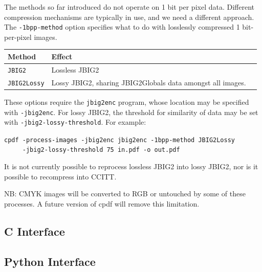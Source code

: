 \documentclass{book}
\begin{document}
\noindent The methods so far introduced do not operate on 1 bit per pixel data. Different compression mechanisms are typically in use, and we need a different approach. The \texttt{-1bpp-method} option specifies what to do with losslessly compressed 1 bit-per-pixel images.

\bigskip
\begin{tabular}{lp{10cm}l}
Method & Effect\\\hline
{\small\texttt{JBIG2}} & Lossless JBIG2 \\
{\small\texttt{JBIG2Lossy}} & Lossy JBIG2, sharing JBIG2Globals data amongst all images.
\end{tabular}
\bigskip

\noindent These options require the \texttt{jbig2enc} program, whose location may be specified with \texttt{-jbig2enc}. For lossy JBIG2, the threshold for similarity of data may be set with \texttt{-jbig2-lossy-threshold}. For example:

  \begin{framed}
  \noindent\small\verb!cpdf -process-images -jbig2enc jbig2enc -1bpp-method JBIG2Lossy!\\
  \noindent\small\verb!     -jbig2-lossy-threshold 75 in.pdf -o out.pdf!
  \end{framed}

\noindent It is not currently possible to reprocess lossless JBIG2 into lossy JBIG2, nor is it possible to recompress into CCITT.

NB: CMYK images will be converted to RGB or untouched by some of these processes. A future version of cpdf will remove this limitation.

\begin{cpdflib}
\clearpage
\section*{C Interface}
\begin{small}\tt

\end{small}
\end{cpdflib}

\begin{pycpdflib}
\clearpage
\section*{Python Interface}
\begin{small}\tt

\end{small}
\end{pycpdflib}
\pagestyle{fancy}
\end{document}
